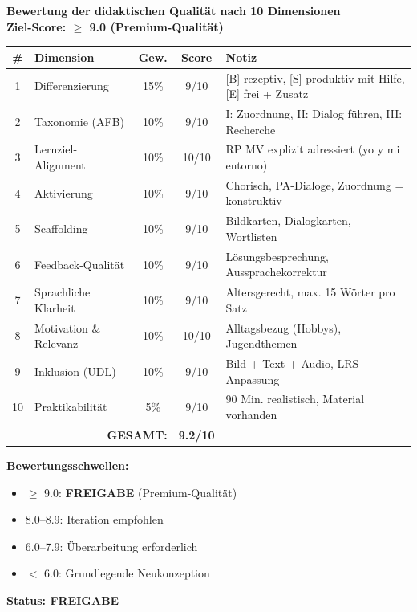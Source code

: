 \documentclass[11pt,a4paper]{article}
\begin{document}
\begin{scorebox}
\textbf{Bewertung der didaktischen Qualität nach 10 Dimensionen}\\
\textbf{Ziel-Score: $\geq$ 9.0 (Premium-Qualität)}

\vspace{1em}
\begin{tabular}{|c|l|c|c|p{4.5cm}|}
\hline
\textbf{\#} & \textbf{Dimension} & \textbf{Gew.} & \textbf{Score} & \textbf{Notiz} \\
\hline
1 & Differenzierung & 15\% & 9/10 & [B] rezeptiv, [S] produktiv mit Hilfe, [E] frei + Zusatz \\
\hline
2 & Taxonomie (AFB) & 10\% & 9/10 & I: Zuordnung, II: Dialog führen, III: Recherche \\
\hline
3 & Lernziel-Alignment & 10\% & 10/10 & RP MV explizit adressiert (yo y mi entorno) \\
\hline
4 & Aktivierung & 10\% & 9/10 & Chorisch, PA-Dialoge, Zuordnung = konstruktiv \\
\hline
5 & Scaffolding & 10\% & 9/10 & Bildkarten, Dialogkarten, Wortlisten \\
\hline
6 & Feedback-Qualität & 10\% & 9/10 & Lösungsbesprechung, Aussprachekorrektur \\
\hline
7 & Sprachliche Klarheit & 10\% & 9/10 & Altersgerecht, max. 15 Wörter pro Satz \\
\hline
8 & Motivation \& Relevanz & 10\% & 10/10 & Alltagsbezug (Hobbys), Jugendthemen \\
\hline
9 & Inklusion (UDL) & 10\% & 9/10 & Bild + Text + Audio, LRS-Anpassung \\
\hline
10 & Praktikabilität & 5\% & 9/10 & 90 Min. realistisch, Material vorhanden \\
\hline
\multicolumn{3}{|r|}{\textbf{GESAMT:}} & \textbf{9.2/10} & \\
\hline
\end{tabular}

\vspace{1em}
\textbf{Bewertungsschwellen:}
\begin{itemize}
    \item[$\checkmark$] \textcolor{successgreen}{$\geq$ 9.0: \textbf{FREIGABE} (Premium-Qualität)}
    \item[$\Box$] \textcolor{warningorange}{8.0--8.9: Iteration empfohlen}
    \item[$\Box$] 6.0--7.9: Überarbeitung erforderlich
    \item[$\Box$] $<$ 6.0: Grundlegende Neukonzeption
\end{itemize}

\vspace{1em}
\textcolor{successgreen}{\textbf{Status: FREIGABE}}
\end{scorebox}
\end{document}
